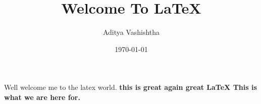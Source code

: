 \documentclass{article}
\author{Aditya Vashishtha}
\title{Welcome To \LaTeX}
\date{\today}
\begin{document}
\calligra
\maketitle
\normalfont
Well welcome me to the latex world.
\bf this is great
\rm again great \LaTeX
\normalfont
{} {This is what we are here for.}
\end{document}
